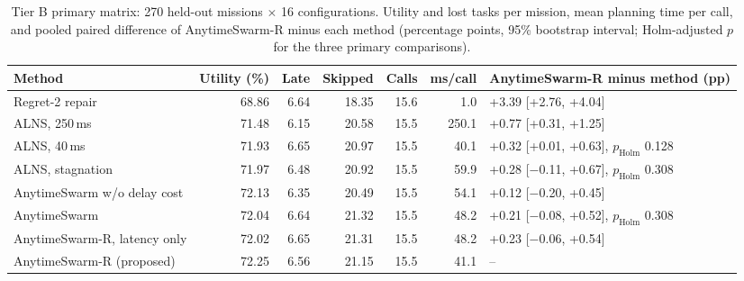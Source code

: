 \begin{table}[t]
\caption{Tier B primary matrix: 270 held-out missions $\times$ 16 configurations. Utility and lost tasks per mission, mean planning time per call, and pooled paired difference of AnytimeSwarm-R minus each method (percentage points, 95\% bootstrap interval; Holm-adjusted $p$ for the three primary comparisons).}\label{tab:main}
\centering\small
\setlength{\tabcolsep}{3pt}
\begin{tabular}{lrrrrrl}
\toprule
Method & Utility (\%) & Late & Skipped & Calls & ms/call & AnytimeSwarm-R minus method (pp) \\
\midrule
Regret-2 repair & 68.86 & 6.64 & 18.35 & 15.6 & 1.0 & +3.39 [+2.76, +4.04] \\
ALNS, 250\,ms & 71.48 & 6.15 & 20.58 & 15.5 & 250.1 & +0.77 [+0.31, +1.25] \\
ALNS, 40\,ms & 71.93 & 6.65 & 20.97 & 15.5 & 40.1 & +0.32 [+0.01, +0.63], $p_{\mathrm{Holm}}$ 0.128 \\
ALNS, stagnation & 71.97 & 6.48 & 20.92 & 15.5 & 59.9 & +0.28 [$-$0.11, +0.67], $p_{\mathrm{Holm}}$ 0.308 \\
AnytimeSwarm w/o delay cost & 72.13 & 6.35 & 20.49 & 15.5 & 54.1 & +0.12 [$-$0.20, +0.45] \\
AnytimeSwarm & 72.04 & 6.64 & 21.32 & 15.5 & 48.2 & +0.21 [$-$0.08, +0.52], $p_{\mathrm{Holm}}$ 0.308 \\
AnytimeSwarm-R, latency only & 72.02 & 6.65 & 21.31 & 15.5 & 48.2 & +0.23 [$-$0.06, +0.54] \\
AnytimeSwarm-R (proposed) & 72.25 & 6.56 & 21.15 & 15.5 & 41.1 & -- \\
\bottomrule
\end{tabular}
\end{table}
